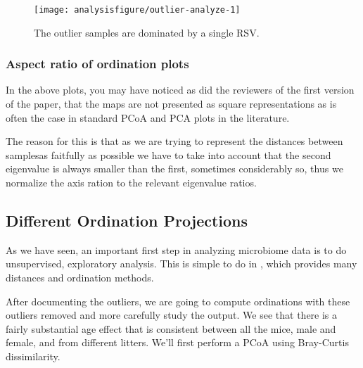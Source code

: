 \begin{knitrout}
\color{fgcolor}\begin{kframe}
\begin{alltt}
 \hlkwb{<-} \hlstd{(}\hlstd{(} \hlstd{,} \hlstd{(} \hlopt{/} 
\hlstd{(rel_abund[,} \hlstd{],}  \hlstd{=} \hlstd{)} \hlopt{+}
  \hlstd{(}\hlstd{)}
\end{alltt}
\end{kframe}
\end{knitrout}
\begin{figure}[H]
\texttt{[image: analysisfigure/outlier-analyze-1]}
\caption{The outlier samples are dominated by a single RSV.}
\label{fig:outlier-analysize}
\end{figure}

\subsubsection*{Aspect ratio of ordination plots}
In the above plots, you may have noticed as did the reviewers of the first version of the paper, that
the maps are not presented as square representations as is often the case in
standard PCoA and PCA plots in the literature.

The reason for this is that as we are trying to represent the distances between samplesas faitfully as possible
we have to take into account that the second eigenvalue is always smaller
than the first, sometimes considerably so, thus we normalize the axis ration to the relevant eigenvalue
ratios.

\subsection*{Different Ordination Projections}

As we have seen, an important first step in analyzing microbiome data is to do
unsupervised, exploratory analysis. This is simple to do in
, which provides many distances and ordination
methods.

After documenting the outliers, we are going to compute ordinations
with these outliers removed and more carefully study the output. We
see that there is a fairly substantial age effect that is consistent
between all the mice, male and female, and from different
litters. We'll first perform a PCoA using Bray-Curtis dissimilarity.

